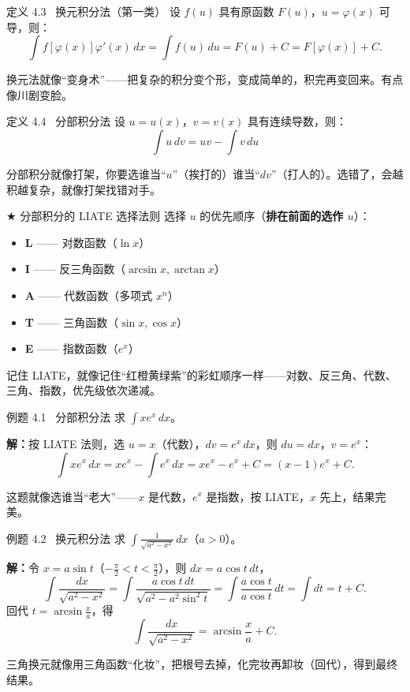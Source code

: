 \documentclass[12pt,a4paper]{article}
\newcommand{\purpletext}[1]{{\color{Royal}\textbf{#1}}}
\newcommand{\humor}[1]{\par\smallskip\begin{humorbox}#1\end{humorbox}\smallskip}
\begin{document}
\begin{defbox}{定义 4.3 \ 换元积分法（第一类）}
设 $f(u)$ 具有原函数 $F(u)$，$u = \varphi(x)$ 可导，则：
\[
\int f[\varphi(x)]\varphi'(x)\,dx = \int f(u)\,du = F(u) + C = F[\varphi(x)] + C.
\]
\end{defbox}
\humor{换元法就像“变身术”——把复杂的积分变个形，变成简单的，积完再变回来。有点像川剧变脸。}

\begin{defbox}{定义 4.4 \ 分部积分法}
设 $u = u(x)$，$v = v(x)$ 具有连续导数，则：
\[
\int u\,dv = uv - \int v\,du
\]
\end{defbox}
\humor{分部积分就像打架，你要选谁当“$u$”（挨打的）谁当“$dv$”（打人的）。选错了，会越积越复杂，就像打架找错对手。}

\begin{tipbox}{$\bigstar$ 分部积分的 LIATE 选择法则}
选择 $u$ 的优先顺序（\purpletext{排在前面的选作 $u$}）：
\begin{itemize}[leftmargin=2em, itemsep=2pt]
  \item \textbf{L} —— 对数函数（$\ln x$）
  \item \textbf{I} —— 反三角函数（$\arcsin x, \arctan x$）
  \item \textbf{A} —— 代数函数（多项式 $x^n$）
  \item \textbf{T} —— 三角函数（$\sin x, \cos x$）
  \item \textbf{E} —— 指数函数（$e^x$）
\end{itemize}
\end{tipbox}
\humor{记住 LIATE，就像记住“红橙黄绿紫”的彩虹顺序一样——对数、反三角、代数、三角、指数，优先级依次递减。}

\begin{exbox}{例题 4.1 \ 分部积分法}
求 $\displaystyle\int x e^x\,dx$。

\sffamily\textbf{解：}\normalfont 按 LIATE 法则，选 $u = x$（代数），$dv = e^x\,dx$，则 $du = dx$，$v = e^x$：
\[
\int x e^x\,dx = xe^x - \int e^x\,dx = xe^x - e^x + C = (x-1)e^x + C.
\]
\end{exbox}
\humor{这题就像选谁当“老大”——$x$ 是代数，$e^x$ 是指数，按 LIATE，$x$ 先上，结果完美。}

\begin{exbox}{例题 4.2 \ 换元积分法}
求 $\displaystyle\int \frac{1}{\sqrt{a^2 - x^2}}\,dx$（$a > 0$）。

\sffamily\textbf{解：}\normalfont 令 $x = a\sin t$（$-\frac{\pi}{2} < t < \frac{\pi}{2}$），则 $dx = a\cos t\,dt$，
\[
\int \frac{dx}{\sqrt{a^2-x^2}} = \int \frac{a\cos t\,dt}{\sqrt{a^2 - a^2\sin^2 t}} = \int \frac{a\cos t}{a\cos t}\,dt = \int dt = t + C.
\]
回代 $t = \arcsin\frac{x}{a}$，得
\[
\int \frac{dx}{\sqrt{a^2-x^2}} = \arcsin\frac{x}{a} + C.
\]
\end{exbox}
\humor{三角换元就像用三角函数“化妆”，把根号去掉，化完妆再卸妆（回代），得到最终结果。}
\end{document}
